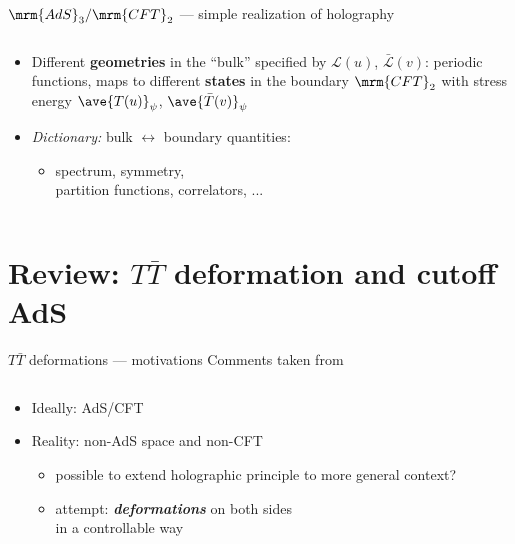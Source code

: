 \documentclass[
	10pt
	,noamsthm
]{beamer}
\newcommand{\TTbar}{\texorpdfstring{\ensuremath{T\bar{T}}}{TTbar}\xspace}
\begin{document}
\begin{frame}{$\mrm{AdS}_3/\mrm{CFT}_2$ --- simple realization of holography}{%
	\textcite{Aharony:1999ti}
}
\begin{columns}
\figAdsCft
\begin{column}{.72\textwidth}
	\begin{itemize}
	\item Different \textbf{geometries} in the ``bulk''
	\eqBanados
	specified by $\mathcal L(u)$, $\bar{\mathcal L}(v)$: periodic functions, maps to different \textbf{states} in the boundary $\mrm{CFT}_2$ with stress energy $\ave{T(u)}_\psi$, $\ave{\bar{T}(v)}_\psi$

	\item \textit{Dictionary:} bulk $\leftrightarrow$ boundary quantities:\\
		\begin{itemize}
		\item spectrum,
			symmetry,\\
			partition functions,
			correlators, ...
		\end{itemize}
	\end{itemize}

\end{column}
\end{columns}
\end{frame}

\section{\textbf{Review:} \TTbar deformation and cutoff AdS} \label{se:cutoffholography}

\begin{frame}{\TTbar deformations --- motivations}{%
	Comments taken from \textcite{Cui:2023jrb}
}
\begin{columns}
\figAdsCft
\begin{column}{.72\textwidth}
	\begin{itemize}
	\item Ideally: AdS/CFT
	\item Reality: non-AdS space and non-CFT
	\begin{itemize}
		\item possible to extend holographic principle to more general context?
		\item attempt: \textbf{\textit{deformations}} on both sides\\
		in a controllable way
	\end{itemize}
	\end{itemize}
\end{column}
\end{columns}
\end{frame}
\end{document}
